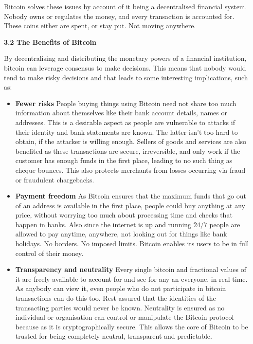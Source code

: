 \documentclass[12pt,a4paper]{report}
\begin{document}
\begin{flushleft}
Bitcoin solves these issues by account of it being a decentralised financial system. Nobody owns or regulates the money, and every transaction is accounted for.  These coins either are spent, or stay put. Not moving anywhere.

\newpage
\vspace{10mm}
\textbf{3.2 The Benefits of Bitcoin}
\vspace{10mm}

By decentralising and distributing the monetary powers of a financial institution, bitcoin can leverage consensus to make decisions. This means that nobody would tend to make risky decisions and that leads to some interesting implications, such as:

\begin{itemize}

 \item \textbf{Fewer risks} \newline People buying things using Bitcoin need not share too much information about themselves like their bank account details, names or addresses. This is a desirable aspect as people are vulnerable to attacks if their identity and bank statements are known. \newline 
 The latter isn't too hard  to obtain, if the attacker is willing enough.
 Sellers of goods and services are also benefited as these transactions are secure, irreversible, and only work if the customer has enough funds in the first place, leading to no such thing as cheque bounces. This also protects merchants from losses occurring via fraud or fraudulent chargebacks.
  
  \vspace{10mm}
  \item \textbf{Payment freedom} \newline
  As Bitcoin ensures that the maximum funds that go out of an address is available in the first place, people could buy anything at any price, without worrying too much about processing time and checks that happen in banks. Also since the internet is up and running 24/7 people are allowed to pay anytime, anywhere, not looking out for things like bank holidays. No borders. No imposed limits. Bitcoin enables its users to be in full control of their money.
  \vspace{10mm}

 \item \textbf{Transparency and neutrality} \newline 
 Every single bitcoin and fractional values of it are freely available to account for and see for any an everyone, in real time. As anybody can view it, even people who do not participate in bitcoin transactions can do this too. Rest assured that the identities of the transacting parties would never be known.\newline
 Neutrality is ensured as no individual or organisation can control or manipulate the Bitcoin protocol because as it is cryptographically secure. This allows the core of Bitcoin to be trusted for being completely neutral, transparent and predictable.
 

\end{itemize}
\end{flushleft}
\end{document}
